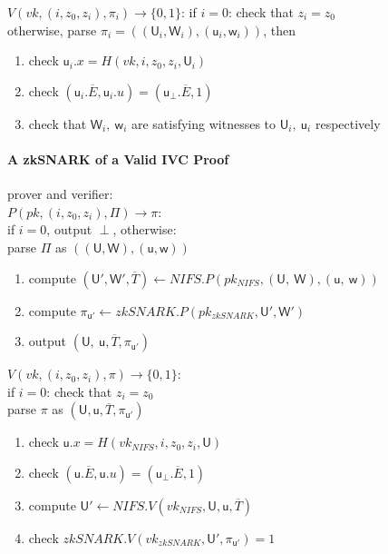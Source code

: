 \documentclass{article}
\theoremstyle{definition}
\begin{document}
\underline{$V(vk, (i, z_0, z_i), \pi_i) \rightarrow \{0,1\}$}:
if $i=0$: check that $z_i=z_0$\\
otherwise, parse $\pi_i = ( (\mathsf{U}_i, \mathsf{W}_i), (\mathsf{u}_i, \mathsf{w}_i))$, then
\begin{enumerate}
	\item check $\mathsf{u}_i.x = H(vk, i, z_0, z_i, \mathsf{U}_i)$
	\item check $(\mathsf{u}_i.{\overline{E}}, \mathsf{u}_i.u) = (\mathsf{u}_{\perp}.{\overline{E}}, 1)$
	\item check that $\mathsf{W}_i,~ \mathsf{w}_i$ are satisfying witnesses to $\mathsf{U}_i,~ \mathsf{u}_i$ respectively
\end{enumerate}

\vspace{0.5cm}

\paragraph{A zkSNARK of a Valid IVC Proof} prover and verifier:\\
\underline{$P(pk, (i, z_0, z_i), \Pi) \rightarrow \pi$}:\\
if $i=0$, output $\perp$, otherwise:\\
parse $\Pi$ as $((\mathsf{U}, \mathsf{W}), (\mathsf{u}, \mathsf{w}))$
\begin{enumerate}
	\item compute $(\mathsf{U}', \mathsf{W}', \overline{T}) \leftarrow NIFS.P(pk_{NIFS}, (\mathsf{U,~W}), (\mathsf{u,~w}))$
	\item compute $\pi_{\mathsf{u}'} \leftarrow zkSNARK.P(pk_{zkSNARK}, \mathsf{U}', \mathsf{W}')$
	\item output $(\mathsf{U,~ u}, \overline{T}, \pi_{\mathsf{u}'})$
\end{enumerate}

\underline{$V(vk, (i, z_0, z_i), \pi) \rightarrow \{0,1\}$}:\\
if $i=0$: check that $z_i=z_0$\\
parse $\pi$ as $(\mathsf{U}, \mathsf{u}, \overline{T}, \pi_{\mathsf{u}'})$
\begin{enumerate}
	\item check $\mathsf{u}.x = H(vk_{NIFS}, i, z_0, z_i, \mathsf{U})$
	\item check $(\mathsf{u}.{\overline{E}}, \mathsf{u}.u) = (\mathsf{u}_{\perp}.{\overline{E}}, 1)$
	\item compute $\mathsf{U}' \leftarrow NIFS.V(vk_{NIFS}, \mathsf{U}, \mathsf{u}, \overline{T})$
	\item check $zkSNARK.V(vk_{zkSNARK}, \mathsf{U}', \pi_{\mathsf{u}'})=1$
\end{enumerate}




\end{document}
